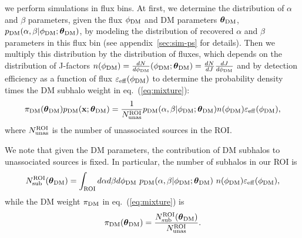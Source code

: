 \documentclass[12pt, a4paper]{article}
\newcommand{\be}{\begin{equation}}
\newcommand{\ee}{\end{equation}}
\newcommand{\bx}{{\bf x}}
\newcommand{\btheta}{\boldsymbol{\theta}}
\begin{document}
we perform simulations in flux bins.
At first, we determine the distribution of $\alpha$ and $\beta$ parameters, given the flux $\phi_{\rm DM}$ and DM parameters $\btheta_{\rm DM}$, $p_{\rm DM}(\alpha,\beta|\phi_{\rm DM};\btheta_{\rm DM})$, by modeling the distribution of recovered $\alpha$ and $\beta$ parameters in this flux bin (see appendix~\ref{sec:sim-ps} for details).
Then we multiply this distribution by the distribution of fluxes, which depends on the distribution of J-factors
$n(\phi_{\rm DM}) = \frac{dN}{d\phi_{\rm DM}} (\phi_{\rm DM};\btheta_{\rm DM}) = \frac{dN}{dJ} \frac{dJ}{d\phi_{\rm DM}}$
and by detection efficiency as a function of flux $\varepsilon_{\rm eff}(\phi_{\rm DM})$ to determine the probability density times the DM subhalo weight in eq.~(\ref{eq:mixture}):
\begin{equation}
\pi_{\rm DM}(\btheta_{\rm DM}) p_{\rm DM}(\bx;\btheta_{\rm DM}) = 
\frac{1}{N^{\rm ROI}_{\rm unas}}
p_{\rm DM}(\alpha,\beta|\phi_{\rm DM};\btheta_{\rm DM}) 
n(\phi_{\rm DM})
\varepsilon_{\rm eff}(\phi_{\rm DM}),
\label{eq:pDM}
\end{equation}
where $N^{\rm ROI}_{\rm unas}$ is the number of unassociated sources in the ROI.

We note that given the DM parameters, the contribution of DM subhalos to unassociated sources is fixed.
In particular, the number of subhalos in our ROI is
\be 
\label{eq:N_ROI}
N^{\rm ROI}_{\rm sub}(\btheta_{\rm DM}) =
\int_{\rm ROI} d\alpha d\beta d\phi_{\rm DM}~p_{\rm DM}(\alpha,\beta|\phi_{\rm DM};\btheta_{\rm DM}) ~n(\phi_{\rm DM}) \varepsilon_{\rm eff}(\phi_{\rm DM}),
\ee
while the DM weight $\pi_{\rm DM}$ in eq.~(\ref{eq:mixture}) is 
\be
\pi_{\rm DM}(\btheta_{\rm DM}) = \frac{N^{\rm ROI}_{\rm sub}(\btheta_{\rm DM})}{N^{\rm ROI}_{\rm unas}}.
\ee
\end{document}
